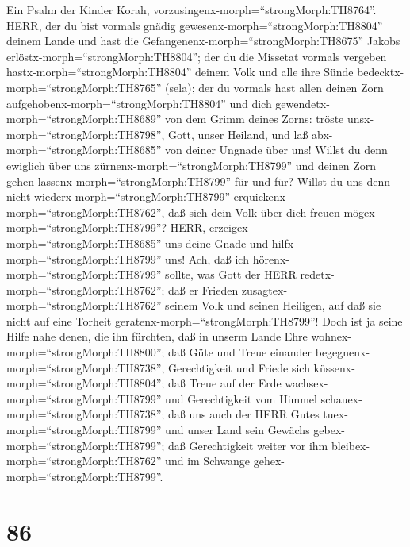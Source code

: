  Ein Psalm der Kinder Korah,
vorzusingenx-morph=``strongMorph:TH8764''. HERR, der du bist vormals
gnädig gewesenx-morph=``strongMorph:TH8804'' deinem Lande und hast die
Gefangenenx-morph=``strongMorph:TH8675'' Jakobs
erlöstx-morph=``strongMorph:TH8804'';  der du die Missetat
vormals vergeben hastx-morph=``strongMorph:TH8804'' deinem Volk und alle
ihre Sünde bedecktx-morph=``strongMorph:TH8765'' (sela); 
der du vormals hast allen deinen Zorn
aufgehobenx-morph=``strongMorph:TH8804'' und dich
gewendetx-morph=``strongMorph:TH8689'' von dem Grimm deines Zorns:
 tröste unsx-morph=``strongMorph:TH8798'', Gott, unser
Heiland, und laß abx-morph=``strongMorph:TH8685'' von deiner Ungnade
über uns!  Willst du denn ewiglich über uns
zürnenx-morph=``strongMorph:TH8799'' und deinen Zorn gehen
lassenx-morph=``strongMorph:TH8799'' für und für?  Willst du
uns denn nicht wiederx-morph=``strongMorph:TH8799''
erquickenx-morph=``strongMorph:TH8762'', daß sich dein Volk über dich
freuen mögex-morph=``strongMorph:TH8799''?  HERR,
erzeigex-morph=``strongMorph:TH8685'' uns deine Gnade und
hilfx-morph=``strongMorph:TH8799'' uns!  Ach, daß ich
hörenx-morph=``strongMorph:TH8799'' sollte, was Gott der HERR
redetx-morph=``strongMorph:TH8762''; daß er Frieden
zusagtex-morph=``strongMorph:TH8762'' seinem Volk und seinen Heiligen,
auf daß sie nicht auf eine Torheit
geratenx-morph=``strongMorph:TH8799''!  Doch ist ja seine
Hilfe nahe denen, die ihn fürchten, daß in unserm Lande Ehre
wohnex-morph=``strongMorph:TH8800'';  daß Güte und Treue
einander begegnenx-morph=``strongMorph:TH8738'', Gerechtigkeit und
Friede sich küssenx-morph=``strongMorph:TH8804'';  daß
Treue auf der Erde wachsex-morph=``strongMorph:TH8799'' und
Gerechtigkeit vom Himmel schauex-morph=``strongMorph:TH8738'';
 daß uns auch der HERR Gutes
tuex-morph=``strongMorph:TH8799'' und unser Land sein Gewächs
gebex-morph=``strongMorph:TH8799'';  daß Gerechtigkeit
weiter vor ihm bleibex-morph=``strongMorph:TH8762'' und im Schwange
gehex-morph=``strongMorph:TH8799''.

\hypertarget{section-85}{%
\section{86}\label{section-85}}

